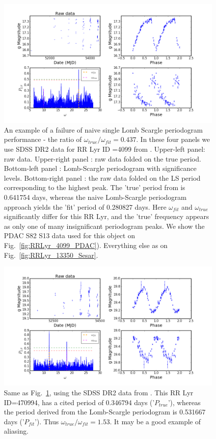 \documentclass[DM,lsstdraft,toc,usenatbib]{lsstdoc}
\begin{document}
\begin{figure}
\includegraphics[width=\textwidth]{figs/Fig_2_RRLyr_LS_periodogram_ID_4099_g}
\caption{An example of a failure of naive single Lomb Scargle periodogram performance -  the ratio of $\omega_{true} / \omega_{fit} = 0.437$.  In these four panels we use  SDSS DR2  data for RR Lyr ID =4099 from  \citep{sesar2010} . Upper-left panel:  raw data.  Upper-right panel : raw data folded on the true period.  Bottom-left panel : Lomb-Scargle periodogram with significance levels.  Bottom-right panel : the raw data folded  on the LS period corresponding to the highest peak. The 'true' period from \citep{sesar2010} is  0.641754 days, whereas the naive Lomb-Scargle periodogram approach yields the 'fit' period of 0.280827  days. Here $\omega_{fit}$ and $\omega_{true}$ significantly differ for this RR Lyr,  and the 'true' frequency  appears as only one of many insignificant periodogram peaks.  We show the PDAC S82 S13 data used for this object on Fig.~\ref{fig:RRLyr_4099_PDAC}).  Everything else as on Fig.~\ref{fig:RRLyr_13350_Sesar}.}
\label{fig:RRLyr_4099_Sesar}
\end{figure}


\begin{figure}
\includegraphics[width=\textwidth]{figs/Fig_2_RRLyr_LS_periodogram_ID_470994_g}
\caption{Same as Fig.~\ref{fig:RRLyr_4099_Sesar}, using the SDSS DR2 data from \citep{sesar2010}.  This RR Lyr ID=470994, has a cited period of 0.346794  days ('$P_{true}$'), whereas the period derived from the Lomb-Scargle periodogram is 0.531667 days ('$P_{fit}$').  Thus  $\omega_{true} / \omega_{fit} = 1.53$. It may be a  good example of aliasing. }
\label{fig:RRLyr_470994_Sesar}
\end{figure}
\end{document}
